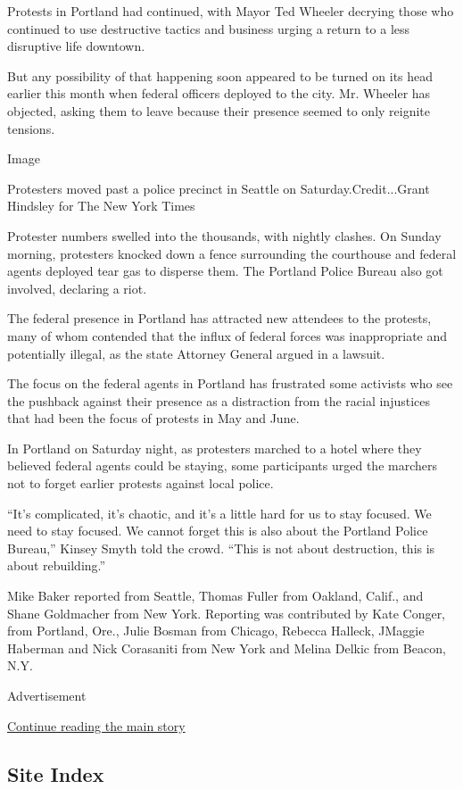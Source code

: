 Protests in Portland had continued, with Mayor Ted Wheeler decrying
those who continued to use destructive tactics and business urging a
return to a less disruptive life downtown.

But any possibility of that happening soon appeared to be turned on its
head earlier this month when federal officers deployed to the city. Mr.
Wheeler has objected, asking them to leave because their presence seemed
to only reignite tensions.

Image

Protesters moved past a police precinct in Seattle on
Saturday.Credit...Grant Hindsley for The New York Times

Protester numbers swelled into the thousands, with nightly clashes. On
Sunday morning, protesters knocked down a fence surrounding the
courthouse and federal agents deployed tear gas to disperse them. The
Portland Police Bureau also got involved, declaring a riot.

The federal presence in Portland has attracted new attendees to the
protests, many of whom contended that the influx of federal forces was
inappropriate and potentially illegal, as the state Attorney General
argued in a lawsuit.

The focus on the federal agents in Portland has frustrated some
activists who see the pushback against their presence as a distraction
from the racial injustices that had been the focus of protests in May
and June.

In Portland on Saturday night, as protesters marched to a hotel where
they believed federal agents could be staying, some participants urged
the marchers not to forget earlier protests against local police.

``It's complicated, it's chaotic, and it's a little hard for us to stay
focused. We need to stay focused. We cannot forget this is also about
the Portland Police Bureau,'' Kinsey Smyth told the crowd. ``This is not
about destruction, this is about rebuilding.''

Mike Baker reported from Seattle, Thomas Fuller from Oakland, Calif.,
and Shane Goldmacher from New York. Reporting was contributed by Kate
Conger, from Portland, Ore., Julie Bosman from Chicago, Rebecca Halleck,
JMaggie Haberman and Nick Corasaniti from New York and Melina Delkic
from Beacon, N.Y.

Advertisement

\protect\hyperlink{after-bottom}{Continue reading the main story}

\hypertarget{site-index}{%
\subsection{Site Index}\label{site-index}}

